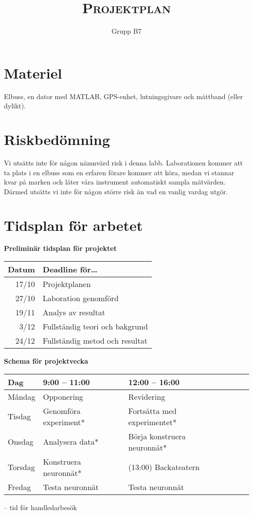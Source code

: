 \documentclass[]{article}
\title{{\huge \textsc{Projektplan}}}
\author{Grupp B7}
\begin{document}
\maketitle
{}
\tableofcontents
\cleardoublepage
{}



\section{Materiel}
Elbuss, en dator med MATLAB, GPS-enhet, lutningsgivare och
måttband (eller dylikt).



\section{Riskbedömning}
Vi utsätts inte för någon nämnvärd risk i denna labb.
Laborationen kommer att ta plats i en elbuss som en erfaren förare kommer att köra,
medan vi stannar kvar på marken och låter våra instrument automatiskt sampla mätvärden.
Därmed utsätts vi inte för någon större risk än vad en vanlig vardag utgör.

\section{Tidsplan för arbetet}
\begin{center}
	\textbf{Preliminär tidsplan för projektet} \par
	\begin{tabular}{r | l}
		Datum & Deadline för\ldots \\ \hline
		17/10 & Projektplanen \\
		27/10 & Laboration genomförd \\
		19/11 & Analys av resultat \\
		3/12 & Fullständig teori och bakgrund \\
		24/12 & Fullständig metod och resultat \\
		\hline
	\end{tabular} \par

	\vspace{0.75cm}

	\textbf{Schema för projektvecka} \par
	\begin{tabular}{l | l l l l l}
		Dag & 9:00 -- 11:00 & 12:00 -- 16:00 \\ \hline
		Måndag & Opponering & Revidering \\
		Tisdag & Genomföra experiment* & Fortsätta med experimentet* \\
		Onsdag & Analysera data* & Börja konstruera neuronnät* \\
		Torsdag & Konstruera neuronnät* & (13:00) Backateatern \\
		Fredag & Testa neuronnät & Testa neuronnät \\
		\hline
	\end{tabular} \par
	\hfill {\scriptsize * -- tid för handledarbesök}
\end{center}

\clearpage
\printbibliography
\end{document}
